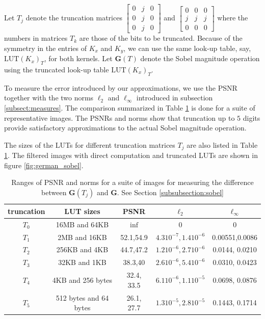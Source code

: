 \documentclass[12pt]{amsart}
\theoremstyle{definition}
\theoremstyle{remark}
\numberwithin{thm}{section}
\newcommand{\LUT}{\text{LUT}}
\begin{document}
Let $T_j$ denote the truncation matrices
$\begin{bmatrix}
0 & j & 0\\
0 & j & 0\\
0 & j & 0
\end{bmatrix}
$ and 
$\begin{bmatrix}
0 & 0 & 0\\
j & j & j\\
0 & 0 & 0
\end{bmatrix}
$
where the numbers in matrices $T_k$ are those of the bits to be truncated. Because of the symmetry in the entries of $K_x$ and $K_y$, we can use the same look-up table, say, $\LUT(K_x)_T$, for both kernels. Let $\mathbf{G}(T)$ denote the Sobel magnitude operation using the truncated look-up table $\LUT(K_x)_T$.

To measure the error introduced by our approximations, we use the PSNR together with the two norms $\ell_2$ and $\ell_{\infty}$ introduced in subsection \ref{subsect:measures}. The comparison summarized in Table \ref{tbl:sobel} is done for a suite of representative images. The PSNRs and norms show that truncation up to $5$ digits provide satisfactory approximations to the actual Sobel magnitude operation.

The sizes of the LUTs for different truncation matrices $T_j$ are also listed in Table \ref{tbl:sobel}. The filtered images with direct computation and truncated LUTs are shown in figure \ref{fig:german_sobel}.
\begin{center}
\begin{table}
    \begin{tabular}{ | c | c | c | c | c | }
    \hline
    \hline
truncation &	LUT sizes	&PSNR 	&$\ell_2$ 	&$\ell_{\infty}$ \\ \hline
$T_0$&	16MB and 64KB		&$\inf$		&0	&0\\ \hline
$T_1$&	2MB and 16KB		&52.1,54.9	&$4.3 10^{-7}, 1.4 10^{-6}$	&0.00551,0.0086\\ \hline
$T_2$&	256KB and 4KB		&44.7,47.2	&$1.2 10^{-6}, 2.7 10^{-6}$	&0.0144, 0.0210\\ \hline
$T_3$&	32KB and 1KB		&38.3,40	&$2.6 10^{-6}, 5.4 10^{-6}$	&0.0310, 0.0423\\ \hline
$T_4$&	4KB	and 256 bytes	&32.4, 33.5	&$6.1 10^{-6}, 1.1 10^{-5}$	&0.0698, 0.0876\\ \hline
$T_5$&	512 bytes and 64 bytes &26.1, 27.7	&$1.3 10^{-5}, 2.8 10^{-5}$		&0.1443, 0.1714\\ \hline
 \end{tabular}
\caption{Ranges of PSNR and norms for a suite of images for measuring the difference between $\mathbf{G}(T_j)$ and $\mathbf{G}$. See Section \ref{subsubsection:sobel}}\label{tbl:sobel}
\end{table} 
\end{center}
\end{document}
